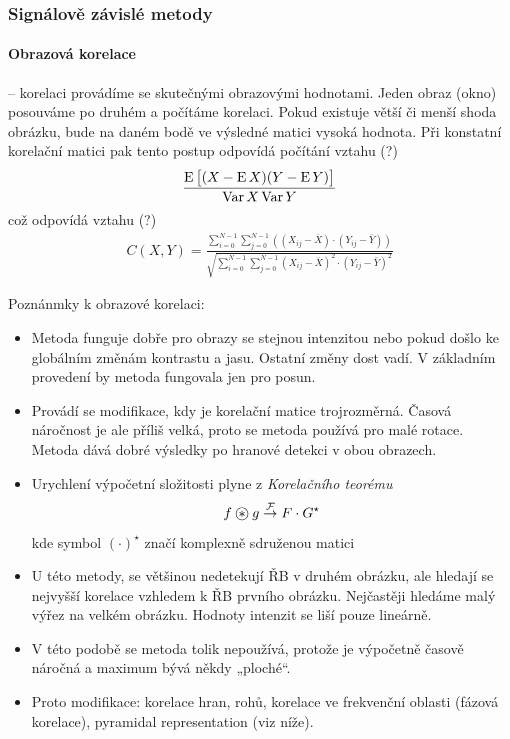 \subsubsection{Signálově závislé metody}

\paragraph{Obrazová korelace} -- korelaci provádíme se skutečnými obrazovými hodnotami. Jeden obraz (okno)
posouváme po druhém a počítáme korelaci. Pokud existuje větší či menší shoda obrázku, bude na daném bodě ve výsledné matici
vysoká hodnota. Při konstatní korelační matici pak tento postup odpovídá počítání vztahu (?)
\begin{align}
\frac{\operatorname{E}\left[(X-\operatorname{E} X)(Y-\operatorname{E} Y)\right]}{\operatorname{Var} X \operatorname{Var} Y}
\end{align}
což odpovídá vztahu (?)
\begin{align}
C(X,Y)=\frac{\sum\limits_{i=0}^{N-1}
\sum\limits_{j=0}^{N-1}((X_{ij}-\bar{X})\cdot(Y_{ij}-\bar{Y}))}
{\sqrt{\sum\limits_{i=0}^{N-1}\sum\limits_{j=0}^{N-1}(X_{ij}-\bar{X})^2\cdot(Y_{ij}-\bar{Y})^2}}
\end{align}

Poznánmky k obrazové korelaci:
\begin{itemize}
	\item Metoda funguje dobře pro obrazy se stejnou intenzitou nebo pokud došlo ke globálním změnám kontrastu a jasu. Ostatní změny
dost vadí. V základním provedení by metoda fungovala jen pro posun. 

	\item Provádí se modifikace, kdy je korelační matice trojrozměrná. Časová náročnost je ale příliš velká, proto se metoda používá
pro malé rotace. Metoda dává dobré výsledky po hranové detekci v obou obrazech.

\item Urychlení výpočetní složitosti plyne z \emph{Korelačního teorému}
\begin{equation}
f\corr g \stackrel{\CFT}{\rightarrow}F\cdot G^\star
\end{equation}
kde symbol $(\cdot)^\star$ značí komplexně sdruženou matici

\item U této metody, se většinou nedetekují ŘB v druhém obrázku, ale hledají se nejvyšší korelace vzhledem k ŘB prvního obrázku. Nejčastěji hledáme malý výřez na velkém obrázku. Hodnoty intenzit se liší pouze lineárně.

\item V této podobě se metoda tolik nepoužívá, protože je výpočetně časově náročná a maximum bývá někdy „ploché“.

\item Proto modifikace: korelace hran, rohů, korelace ve frekvenční oblasti (fázová korelace), pyramidal representation (viz níže).

\end{itemize}


